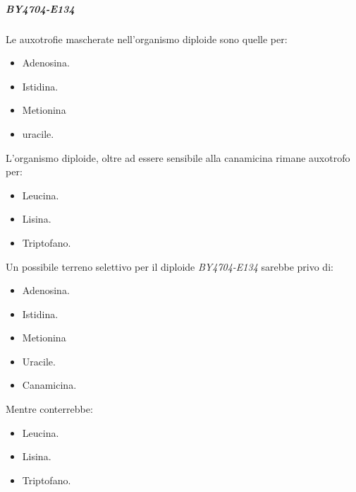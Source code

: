 				\subparagraph*{\emph{BY4704-E134}}
				Le auxotrofie mascherate nell'organismo diploide sono quelle per:
				\begin{multicols}{4}
					\begin{itemize}
						\item Adenosina.
						\item Istidina.
						\item Metionina
						\item uracile.
					\end{itemize}
				\end{multicols}
				L'organismo diploide, oltre ad essere sensibile alla canamicina rimane auxotrofo per:
				\begin{multicols}{3}
					\begin{itemize}
						\item Leucina.
						\item Lisina.
						\item Triptofano.
					\end{itemize}
				\end{multicols}
				Un possibile terreno selettivo per il diploide \emph{BY4704-E134} sarebbe privo di:
				\begin{multicols}{4}
					\begin{itemize}
						\item Adenosina.
						\item Istidina.
						\item Metionina
						\item Uracile.
						\item Canamicina.
					\end{itemize}
				\end{multicols}
				Mentre conterrebbe:
				\begin{multicols}{3}
					\begin{itemize}
						\item Leucina.
						\item Lisina.
						\item Triptofano.
					\end{itemize}
				\end{multicols}

